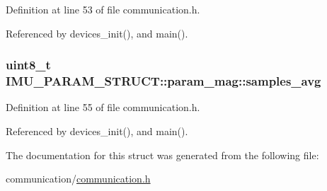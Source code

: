 Definition at line 53 of file communication.h.



Referenced by devices\_\-init(), and main().

\hypertarget{structIMU__PARAM__STRUCT_1_1param__mag_a52c22cae6940eb39fb72aca66cfeba9a}{
\subsubsection[{samples\_\-avg}]{\setlength{\rightskip}{0pt plus 5cm}uint8\_\-t {\bf IMU\_\-PARAM\_\-STRUCT::param\_\-mag::samples\_\-avg}}}
\label{structIMU__PARAM__STRUCT_1_1param__mag_a52c22cae6940eb39fb72aca66cfeba9a}


Definition at line 55 of file communication.h.



Referenced by devices\_\-init(), and main().



The documentation for this struct was generated from the following file:\begin{DoxyCompactItemize}
\item 
communication/\hyperlink{communication_8h}{communication.h}\end{DoxyCompactItemize}
